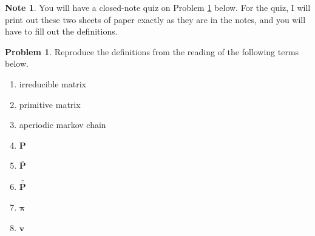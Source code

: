 \documentclass[10pt]{article}
\theoremstyle{definition}
\newtheorem{problem}{Problem}
\newtheorem{note}{Note}
\newcommand{\p}{\mathbf P}
\newcommand{\pb}{\bar {\p}}
\newcommand{\pbb}{\bar {\pb}}
\newcommand{\pr}{\bm \pi}
\begin{document}
\begin{note}
    You will have a closed-note quiz on Problem \ref{problem:def} below.
    For the quiz, I will print out these two sheets of paper exactly as they are in the notes,
    and you will have to fill out the definitions.
\end{note}
\begin{problem}
    \label{problem:def}
    Reproduce the definitions from the reading of the following terms below.
    \begin{enumerate}
        \item irreducible matrix
            \vspace{2in}
        \item primitive matrix
            \vspace{2in}
        \item aperiodic markov chain
            \vspace{2in}
        \item $\p$
            \vspace{2in}
        \item $\pb$
            \vspace{2in}
        \item $\pbb$
            \vspace{2in}
        \item $\pr$
            \vspace{2in}
        \item $\mathbf v$ %
            \vspace{2in}
    \end{enumerate}
\end{problem}
\end{document}

